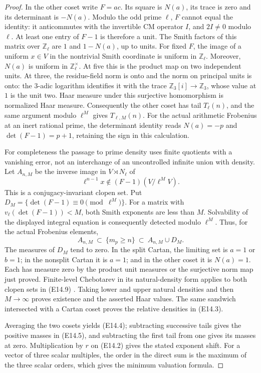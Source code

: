 \begin{proof}
In the other coset write $F=a c$.  Its square is $N(a)$,
its trace is zero and its determinant is $-N(a)$.
Modulo the odd prime $\ell$, $F$ cannot equal the identity:
it anticommutes with the invertible CM operator $I$, and
$2I\ne0$ modulo $\ell$.  At least one entry of $F-1$ is
therefore a unit.  The Smith factors of this matrix over
$\mathbb Z_\ell$ are $1$ and $1-N(a)$, up to units.
For fixed $F$, the image of a uniform $x\in V$ in the
nontrivial Smith coordinate is uniform in $\mathbb Z_\ell$.
Moreover, $N(a)$ is uniform in $\mathbb Z_\ell^\times$.
At five this is the product map on two independent units.
At three, the residue-field norm is onto and the norm on
principal units is onto: the $3$-adic logarithm identifies it
with the trace $\mathbb Z_3[i]\to\mathbb Z_3$, whose value at
$1$ is the unit two.  Haar measure under this surjective
homomorphism is normalized Haar measure.
Consequently the other coset has tail $T_\ell(n)$, and the
same argument modulo $\ell^M$ gives $T_{\ell,M}(n)$.
For the actual arithmetic Frobenius at an inert rational
prime, the determinant identity reads $N(a)=-p$ and
$\det(F-1)=p+1$, retaining the sign in this calculation.

For completeness the passage to prime density uses finite
quotients with a vanishing error, not an interchange of an
uncontrolled infinite union with density.
Let $A_{n,M}$ be the inverse image in $V\rtimes N_\ell$ of
\[
 \ell^{n-1}x\notin(F-1)(V/\ell^M V).
\]
This is a conjugacy-invariant clopen set.  Put
$D_M=\{\det(F-1)\equiv0\pmod{\ell^M}\}$.
For a matrix with $v_\ell(\det(F-1))<M$, both Smith exponents
are less than $M$.  Solvability of the displayed integral
equation is consequently detected modulo $\ell^M$.
Thus, for the actual Frobenius elements,
\[
 A_{n,M}\ \subset\ \{m_p\ge n\}\ \subset\ A_{n,M}\cup D_M.
 \tag{E14.9}
\]
The measures of $D_M$ tend to zero.  In the split Cartan,
the limiting set is $a=1$ or $b=1$; in the nonsplit Cartan
it is $a=1$; and in the other coset it is $N(a)=1$.
Each has measure zero by the product unit measures or the
surjective norm map just proved.  Finite-level Chebotarev
in its natural-density form applies to both clopen sets in
(E14.9) \cite[\S2.1, Theorem 1, and equations (8)--(9)]{E_density_Serre}.
Taking lower and upper natural densities and then $M\to\infty$
proves existence and the asserted Haar values.  The same
sandwich intersected with a Cartan coset proves the relative
densities in (E14.3).

Averaging the two cosets yields (E14.4); subtracting successive
tails gives the positive masses in (E14.5), and subtracting the
first tail from one gives its masses at zero.
Multiplication by $r$ on (E14.2) gives the stated exponent
shift.  For a vector of three scalar multiples, the order in
the direct sum is the maximum of the three scalar orders,
which gives the minimum valuation formula.


\end{proof}
